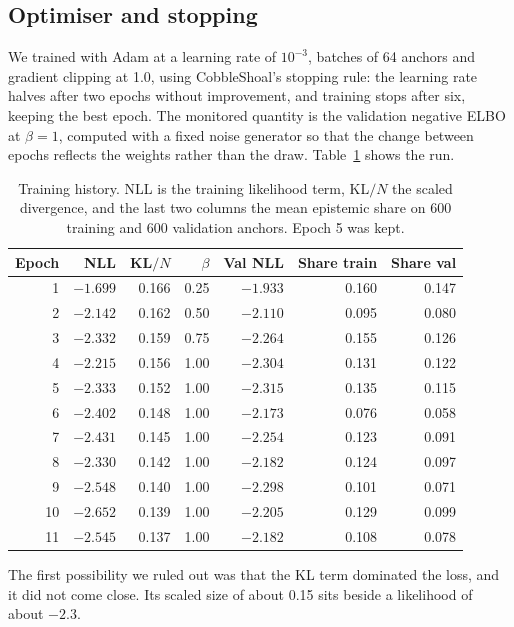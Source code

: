 \documentclass{article}
\begin{document}
\subsection{Optimiser and stopping}
\label{sec:optim}

We trained with Adam at a learning rate of $10^{-3}$, batches of 64 anchors and
gradient clipping at 1.0, using CobbleShoal's stopping rule: the learning rate
halves after two epochs without improvement, and training stops after six,
keeping the best epoch. The monitored quantity is the validation negative ELBO
at $\beta = 1$, computed with a fixed noise generator so that the change
between epochs reflects the weights rather than the draw.
Table~\ref{tab:history} shows the run.

\begin{table}[t]
  \centering
  \caption{Training history. NLL is the training likelihood term, KL$/N$ the
    scaled divergence, and the last two columns the mean epistemic share on 600
    training and 600 validation anchors. Epoch 5 was kept.}
  \label{tab:history}
  \begin{tabular}{rrrrrrr}
    \toprule
    Epoch & NLL & KL$/N$ & $\beta$ & Val NLL & Share train & Share val \\
    \midrule
     1 & $-1.699$ & 0.166 & 0.25 & $-1.933$ & 0.160 & 0.147 \\
     2 & $-2.142$ & 0.162 & 0.50 & $-2.110$ & 0.095 & 0.080 \\
     3 & $-2.332$ & 0.159 & 0.75 & $-2.264$ & 0.155 & 0.126 \\
     4 & $-2.215$ & 0.156 & 1.00 & $-2.304$ & 0.131 & 0.122 \\
     5 & $-2.333$ & 0.152 & 1.00 & $-2.315$ & 0.135 & 0.115 \\
     6 & $-2.402$ & 0.148 & 1.00 & $-2.173$ & 0.076 & 0.058 \\
     7 & $-2.431$ & 0.145 & 1.00 & $-2.254$ & 0.123 & 0.091 \\
     8 & $-2.330$ & 0.142 & 1.00 & $-2.182$ & 0.124 & 0.097 \\
     9 & $-2.548$ & 0.140 & 1.00 & $-2.298$ & 0.101 & 0.071 \\
    10 & $-2.652$ & 0.139 & 1.00 & $-2.205$ & 0.129 & 0.099 \\
    11 & $-2.545$ & 0.137 & 1.00 & $-2.182$ & 0.108 & 0.078 \\
    \bottomrule
  \end{tabular}
\end{table}

The first possibility we ruled out was that the KL term dominated the loss, and
it did not come close. Its scaled size of about 0.15 sits beside a likelihood
of about $-2.3$.
\end{document}
